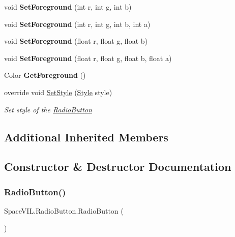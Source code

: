 \begin{DoxyCompactItemize}
void {\bfseries Set\+Foreground} (int r, int g, int b)
\item 
\mbox{\label{class_space_v_i_l_1_1_radio_button_ab300b014939a61279ee85e106a2efcb3}} 
void {\bfseries Set\+Foreground} (int r, int g, int b, int a)
\item 
\mbox{\label{class_space_v_i_l_1_1_radio_button_af77d57ae07d0da7b6d5e9a4435a8c178}} 
void {\bfseries Set\+Foreground} (float r, float g, float b)
\item 
\mbox{\label{class_space_v_i_l_1_1_radio_button_a8ffdbdee0c25b7a828bf2112bd358a62}} 
void {\bfseries Set\+Foreground} (float r, float g, float b, float a)
\item 
\mbox{\label{class_space_v_i_l_1_1_radio_button_a6952208113ed87d7cffad3929b8375e8}} 
Color {\bfseries Get\+Foreground} ()
\item 
override void \mbox{\hyperlink{class_space_v_i_l_1_1_radio_button_a35b4ba018fc4af405f853e6628fb5271}{Set\+Style}} (\mbox{\hyperlink{class_space_v_i_l_1_1_decorations_1_1_style}{Style}} style)
\begin{DoxyCompactList}\small\item\em Set style of the \mbox{\hyperlink{class_space_v_i_l_1_1_radio_button}{Radio\+Button}} \end{DoxyCompactList}\end{DoxyCompactItemize}
\subsection*{Additional Inherited Members}


\subsection{Constructor \& Destructor Documentation}
\mbox{\label{class_space_v_i_l_1_1_radio_button_af9c9ea2e77f10c292aa4337447d4c070}} 
\subsubsection{\texorpdfstring{Radio\+Button()}{RadioButton()}}
{\footnotesize\ttfamily Space\+V\+I\+L.\+Radio\+Button.\+Radio\+Button (\begin{DoxyParamCaption}{ }\end{DoxyParamCaption})\hspace{0.3cm}{\ttfamily [inline]}}



